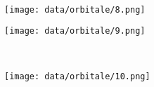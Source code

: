\documentclass[12pt]{article}
\begin{document}
\begin{onehalfspace}
\begin{figure}[!hptb]
\begin{subfigure}[b]{0.4\textwidth}
    \end{subfigure}
    ~ %
    \begin{subfigure}[b]{0.4\textwidth}
        \texttt{[image: data/orbitale/8.png]}

    \end{subfigure}
\end{figure}

\begin{figure}[!hptb]
    \centering
    \begin{subfigure}[b]{0.4\textwidth}
        \texttt{[image: data/orbitale/9.png]}
    \end{subfigure}
    ~ %
    \begin{subfigure}[b]{0.4\textwidth}
        \texttt{[image: data/orbitale/10.png]}
    \end{subfigure}

\end{figure}

\end{onehalfspace}
\end{document}
